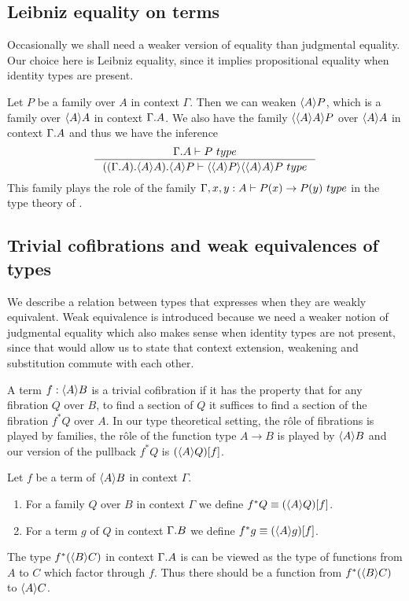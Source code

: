 \subsection{Leibniz equality on terms}
Occasionally we shall need a weaker version of equality than judgmental equality.
Our choice here is Leibniz equality, since it implies propositional equality when
identity types are present.

Let $P$ be a family over $A$ in context $\Gamma$. Then we can weaken
$\ctxwk{A}{P}$, which is a family over $\ctxwk{A}{A}$ in context $\ctxext{\Gamma}{A}$.
We also have the family $\ctxwk{{A}{A}}{P}$ over $\ctxwk{A}{A}$ in context
$\ctxext{\Gamma}{A}$ and thus we have the inference
\begin{equation*}
\inference{\jtype{\ctxext{\Gamma}{A}}{P}}{\jtype{\ctxext{{{\Gamma}{A}}{\ctxwk{A}{A}}}{\ctxwk{A}{P}}}{\ctxwk{{A}{P}}{\ctxwk{{A}{A}}{P}}}}
\end{equation*}
This family plays the role of the family $\jtype{\Gamma,x,y:A}{P(x)\to P(y)}$
in the type theory of \cite{TheBook}.


\subsection{Trivial cofibrations and weak equivalences of types}
We describe a relation between types that expresses when they are weakly equivalent.
Weak equivalence is introduced because we need a weaker notion of judgmental 
equality which also makes sense when identity types are not present, since that
would allow us to state that context extension, weakening and substitution
commute with each other.

A term $f:\ctxwk{A}{B}$ is a trivial cofibration if it has the
property that for any fibration $Q$ over $B$,
to find a section of $Q$ it suffices to find a section of the fibration
$f^\ast Q$ over $A$. In our type theoretical setting, the rôle of fibrations
is played by families, the rôle of the function type $A\to B$ is played by
$\ctxwk{A}{B}$ and our version of the pullback $f^\ast Q$ is $\subst{f}{\ctxwk{A}{Q}}$.

\begin{defn}
Let $f$ be a term of $\ctxwk{A}{B}$ in context $\Gamma$.
\begin{enumerate}
\item For a family $Q$ over $B$ in context $\Gamma$ we define $f^\ast Q\jdeq\subst{f}{\ctxwk{A}{Q}}$.
\item For a term $g$ of $Q$ in context $\ctxext{\Gamma}{B}$ we define $f^\ast g\jdeq\subst{f}{\ctxwk{A}{g}}$.
\end{enumerate} 
\end{defn}
\begin{rmk}
The type $f^\ast(\ctxwk{B}{C})$ in context $\ctxext{\Gamma}{A}$ is can be viewed as the
type of functions from $A$ to $C$ which factor through $f$. Thus there should be
a function from $f^\ast(\ctxwk{B}{C})$ to $\ctxwk{A}{C}$.
\end{rmk}

